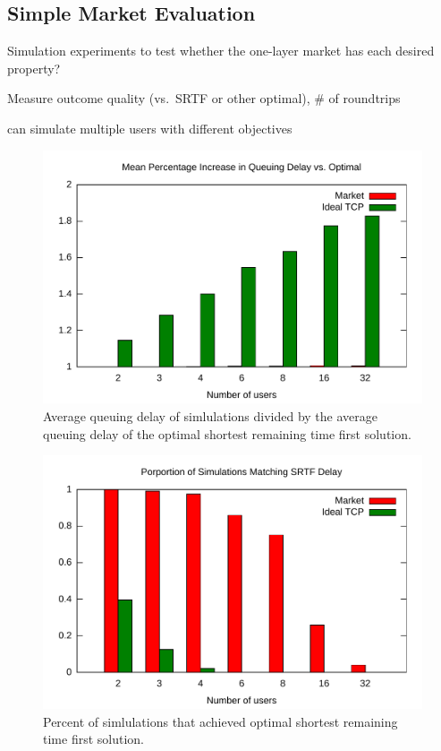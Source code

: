 \subsection{Simple Market Evaluation}

Simulation experiments to test whether the one-layer market has each desired property?

Measure outcome quality (vs.~SRTF or other optimal), \# of roundtrips

can simulate multiple users with different objectives

\begin{figure}
\includegraphics[width=\columnwidth]{plots/delay_over_srtf.pdf}
\caption{Average queuing delay of simlulations divided by the average queuing delay of the optimal shortest remaining time first solution.}
\label{f:delay_over_srtf}
\end{figure}

\begin{figure}
\includegraphics[width=\columnwidth]{plots/percent_match_srtf.pdf}
\caption{Percent of simlulations that achieved optimal shortest remaining time first solution.}
\label{f:percent_match_srtf}
\end{figure}

